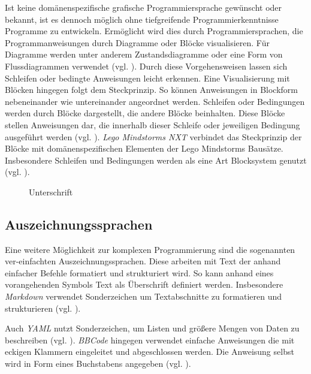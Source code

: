 Ist keine domänenspezifische grafische Programmiersprache gewünscht oder bekannt, ist es dennoch möglich ohne tiefgreifende Programmierkenntnisse Programme zu entwickeln. Ermöglicht wird dies durch Programmiersprachen, die Programmanweisungen durch Diagramme oder Blöcke visualisieren. Für Diagramme werden unter anderem Zustandsdiagramme oder eine Form von Flussdiagrammen verwendet (vgl. \cite{SwissEdu45:online} \cite{DRAKONEd12:online} \cite{PureData15:online}). Durch diese Vorgehensweisen lassen sich Schleifen oder bedingte Anweisungen leicht erkennen. Eine Visualisierung mit Blöcken hingegen folgt dem Steckprinzip. So können Anweisungen in Blockform nebeneinander wie untereinander angeordnet werden. Schleifen oder Bedingungen werden durch Blöcke dargestellt, die andere Blöcke beinhalten. Diese Blöcke stellen Anweisungen dar, die innerhalb dieser Schleife oder jeweiligen Bedingung ausgeführt werden (vgl. \cite{BlocklyG18:online} \cite{NXTSoftw71:online} \cite{SnapBuil34:online} \cite{squeakla50:online}). \emph{Lego Mindstorms NXT} verbindet das Steckprinzip der Blöcke mit domänenspezifischen Elementen der Lego Mindstorms Bausätze. Insbesondere Schleifen und Bedingungen werden als eine Art Blocksystem genutzt (vgl. \cite{NXTSoftw71:online}).

\begin{figure}[h]
\centering
{}
\caption{Unterschrift}
\label{allgGrafProg}
\end{figure}

\subsection{Auszeichnungssprachen}
Eine weitere Möglichkeit zur komplexen Programmierung sind die sogenannten ver-einfachten Auszeichnungssprachen. Diese arbeiten mit Text der anhand einfacher Befehle formatiert und strukturiert wird. So kann anhand eines vorangehenden Symbols Text als Überschrift definiert werden. Insbesondere \emph{Markdown} verwendet Sonderzeichen um Textabschnitte zu formatieren und strukturieren (vgl. \cite{GettingS56:online}).

Auch \emph{YAML} nutzt Sonderzeichen, um Listen und größere Mengen von Daten zu beschreiben (vgl. \cite{TheOffic64:online}). \emph{BBCode} hingegen verwendet einfache Anweisungen die mit eckigen Klammern eingeleitet und abgeschlossen werden. Die Anweisung selbst wird in Form eines Buchstabens angegeben (vgl. \cite{BBCodeor24:online}).

